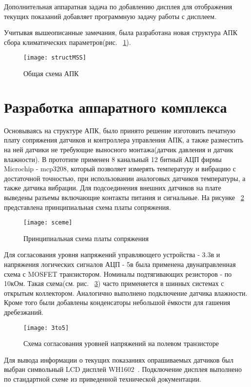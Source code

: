 Дополнительная аппаратная задача по добавлению дисплея для отображения текущих показаний добавляет программную задачу работы с дисплеем. 

Учитывая вышеописанные замечания, была разработана новая структура АПК сбора климатических параметров(рис. ~\ref{fig:structMSS}).
\begin{figure}[h]
	\centering
	\texttt{[image: structMSS]}
	\caption{Общая схема АПК}
	\label{fig:structMSS}
\end{figure}

\section{Разработка аппаратного комплекса}
Основываясь на структуре АПК, было принято решение изготовить печатную плату сопряжения датчиков и контроллера управления АПК, а также разместить на ней датчики не требующие выносного монтажа(датчик давления и датчик влажности).  
В прототипе применен 8 канальный 12 битный АЦП фирмы Microchip - mcp3208, который позволяет измерять температуру и вибрацию с достаточной точностью, при использовании аналоговых датчиков температуры, а также датчика вибрации. Для подсоединения внешних датчиков на плате выведены разъемы включающие контакты питания и сигнальные.
На рисунке  ~\ref{fig:sceme} представлена принципиальная схема платы сопряжения. 
\begin{figure}[H]
	\centering
	\texttt{[image: sceme]}
	\caption{Принципиальная схема платы сопряжения}
	\label{fig:sceme}
\end{figure}

Для согласования уровня напряжений управляющего устройства - 3.3в и напряжения логических сигналов АЦП - 5в была применена двунаправленная схема с MOSFET транзистором. Номиналы подтягивающих резисторов - по 10кОм. Такая схема(см. рис. ~\ref{fig:3to5}) часто применяется в шинных системах с открытым коллектором.  Аналогично выполнено подключение датчика влажности. Кроме того были добавлены конденсаторы небольшой ёмкости для гашения дребезжаний. 
\begin{figure}[H]
	\centering
	\texttt{[image: 3to5]}
	\caption{Схема согласования уровней напряжений на полевом транзисторе}
	\label{fig:3to5}
\end{figure}

Для вывода информации о текущих показаниях опрашиваемых датчиков был выбран символьный LCD дисплей WH1602~\cite{wh1602}. Подключение дисплея выполнено по стандартной схеме из приведенной технической документации.  

